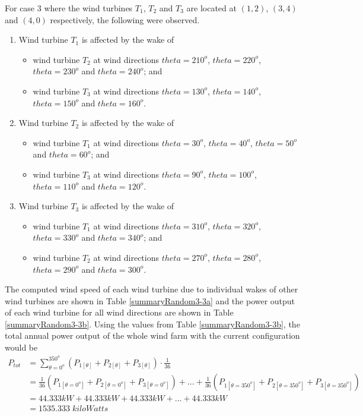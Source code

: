     For case 3 where the wind turbines $T_1$, $T_2$ and $T_3$ are located at $(1,2)$, $(3,4)$ and $(4,0)$ respectively, the following were observed.
    \begin{enumerate}[label=(\subscript{u}{{\arabic*}})]
        \item Wind turbine $T_1$ is affected by the wake of
            \begin{itemize}
                \item wind turbine $T_2$ at wind directions $theta=210^o$, $theta=220^o$, $theta=230^o$ and $theta=240^o$; and
                \item wind turbine $T_3$ at wind directions $theta=130^o$, $theta=140^o$, $theta=150^o$ and $theta=160^o$.
            \end{itemize}
        \item Wind turbine $T_2$ is affected by the wake of
            \begin{itemize}
                \item wind turbine $T_1$ at wind directions $theta=30^o$, $theta=40^o$, $theta=50^o$ and $theta=60^o$; and
                \item wind turbine $T_3$ at wind directions $theta=90^o$, $theta=100^o$, $theta=110^o$ and $theta=120^o$.
            \end{itemize}
        \item Wind turbine $T_3$ is affected by the wake of
            \begin{itemize}
                \item wind turbine $T_1$ at wind directions $theta=310^o$, $theta=320^o$, $theta=330^o$ and $theta=340^o$; and
                \item wind turbine $T_2$ at wind directions $theta=270^o$, $theta=280^o$, $theta=290^o$ and $theta=300^o$.
            \end{itemize}
    \end{enumerate}
    
    The computed wind speed of each wind turbine due to individual wakes of other wind turbines are shown in Table \ref{summaryRandom3-3a} and the power output of each wind turbine for all wind directions are shown in Table \ref{summaryRandom3-3b}. Using the values from Table \ref{summaryRandom3-3b}, the total annual power output of the whole wind farm with the current configuration would be
    \begin{align*}
        P_{tot}
        &= \sum_{\theta=0^o}^{350^o} \left( P_{1[\theta]} + P_{2[\theta]} + P_{3[\theta]} \right) \cdot \frac{1}{36} \\
        &= \frac{1}{36}\left( P_{1[\theta=0^o]} + P_{2[\theta=0^o]} + P_{3[\theta=0^o]} \right) +...+ \frac{1}{36}\left( P_{1[\theta=350^o]} + P_{2[\theta=350^o]} + P_{3[\theta=350^o]} \right) \\
        &= 44.333kW + 44.333kW + 44.333kW +...+ 44.333kW \\
        &= 1535.333\;kiloWatts
    \end{align*}

